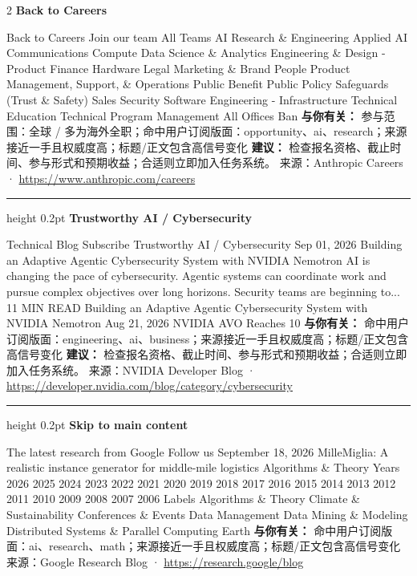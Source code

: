 \documentclass[10.5pt]{ctexart}
\begin{document}
\begin{multicols}{2}
{\large\bfseries Back to Careers}\par
Back to Careers Join our team All Teams AI Research \& Engineering Applied AI Communications Compute Data Science \& Analytics Engineering \& Design - Product Finance Hardware Legal Marketing \& Brand People Product Management, Support, \& Operations Public Benefit Public Policy Safeguards (Trust \& Safety) Sales Security Software Engineering - Infrastructure Technical Education Technical Program Management All Offices Ban
\textbf{与你有关：} 参与范围：全球 / 多为海外全职；命中用户订阅版面：opportunity、ai、research；来源接近一手且权威度高；标题/正文包含高信号变化
\textbf{建议：} 检查报名资格、截止时间、参与形式和预期收益；合适则立即加入任务系统。
{\footnotesize\color{ormuted} 来源：Anthropic Careers · \url{https://www.anthropic.com/careers}}
\vspace{2mm}
\hrule height 0.2pt
\vspace{2mm}
{\large\bfseries Trustworthy AI / Cybersecurity}\par
Technical Blog Subscribe Trustworthy AI / Cybersecurity Sep 01, 2026 Building an Adaptive Agentic Cybersecurity System with NVIDIA Nemotron AI is changing the pace of cybersecurity. Agentic systems can coordinate work and pursue complex objectives over long horizons. Security teams are beginning to... 11 MIN READ Building an Adaptive Agentic Cybersecurity System with NVIDIA Nemotron Aug 21, 2026 NVIDIA AVO Reaches 10
\textbf{与你有关：} 命中用户订阅版面：engineering、ai、business；来源接近一手且权威度高；标题/正文包含高信号变化
\textbf{建议：} 检查报名资格、截止时间、参与形式和预期收益；合适则立即加入任务系统。
{\footnotesize\color{ormuted} 来源：NVIDIA Developer Blog · \url{https://developer.nvidia.com/blog/category/cybersecurity}}
\vspace{2mm}
\hrule height 0.2pt
\vspace{2mm}
{\large\bfseries Skip to main content}\par
The latest research from Google Follow us September 18, 2026 MilleMiglia: A realistic instance generator for middle-mile logistics Algorithms \& Theory Years 2026 2025 2024 2023 2022 2021 2020 2019 2018 2017 2016 2015 2014 2013 2012 2011 2010 2009 2008 2007 2006 Labels Algorithms \& Theory Climate \& Sustainability Conferences \& Events Data Management Data Mining \& Modeling Distributed Systems \& Parallel Computing Earth
\textbf{与你有关：} 命中用户订阅版面：ai、research、math；来源接近一手且权威度高；标题/正文包含高信号变化
{\footnotesize\color{ormuted} 来源：Google Research Blog · \url{https://research.google/blog}}

\end{multicols}
\end{document}
